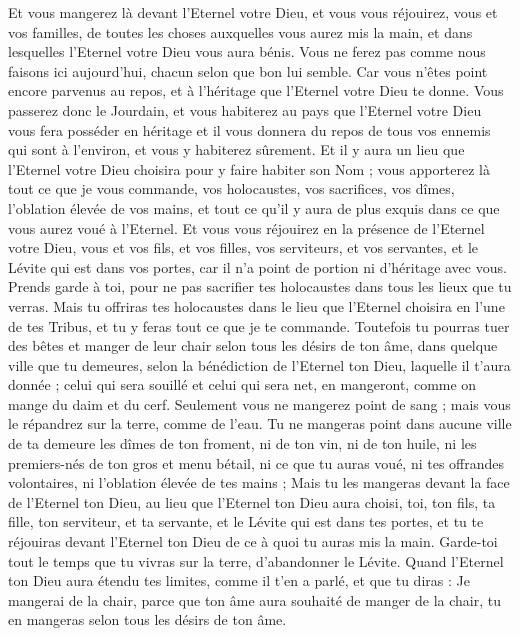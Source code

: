 \begin{multicols}{2}
Et vous mangerez là devant l'Eternel votre Dieu, et vous vous réjouirez, vous et vos familles, de toutes les choses auxquelles vous aurez mis la main, et dans lesquelles l'Eternel votre Dieu vous aura bénis.
Vous ne ferez pas comme nous faisons ici aujourd'hui, chacun selon que bon lui semble.
Car vous n'êtes point encore parvenus au repos, et à l'héritage que l'Eternel votre Dieu te donne.
Vous passerez donc le Jourdain, et vous habiterez au pays que l'Eternel votre Dieu vous fera posséder en héritage et il vous donnera du repos de tous vos ennemis qui sont à l'environ, et vous y habiterez sûrement.
Et il y aura un lieu que l'Eternel votre Dieu choisira pour y faire habiter son Nom ; vous apporterez là tout ce que je vous commande, vos holocaustes, vos sacrifices, vos dîmes, l'oblation élevée de vos mains, et tout ce qu'il y aura de plus exquis dans ce que vous aurez voué à l'Eternel.
Et vous vous réjouirez en la présence de l'Eternel votre Dieu, vous et vos fils, et vos filles, vos serviteurs, et vos servantes, et le Lévite qui est dans vos portes, car il n'a point de portion ni d'héritage avec vous.
Prends garde à toi, pour ne pas sacrifier tes holocaustes dans tous les lieux que tu verras.
Mais tu offriras tes holocaustes dans le lieu que l'Eternel choisira en l'une de tes Tribus, et tu y feras tout ce que je te commande.
Toutefois tu pourras tuer des bêtes et manger de leur chair selon tous les désirs de ton âme, dans quelque ville que tu demeures, selon la bénédiction de l'Eternel ton Dieu, laquelle il t'aura donnée ; celui qui sera souillé et celui qui sera net, en mangeront, comme on mange du daim et du cerf.
Seulement vous ne mangerez point de sang ; mais vous le répandrez sur la terre, comme de l'eau.
Tu ne mangeras point dans aucune ville de ta demeure les dîmes de ton froment, ni de ton vin, ni de ton huile, ni les premiers-nés de ton gros et menu bétail, ni ce que tu auras voué, ni tes offrandes volontaires, ni l'oblation élevée de tes mains ;
Mais tu les mangeras devant la face de l'Eternel ton Dieu, au lieu que l'Eternel ton Dieu aura choisi, toi, ton fils, ta fille, ton serviteur, et ta servante, et le Lévite qui est dans tes portes, et tu te réjouiras devant l'Eternel ton Dieu de ce à quoi tu auras mis la main.
Garde-toi tout le temps que tu vivras sur la terre, d'abandonner le Lévite.
Quand l'Eternel ton Dieu aura étendu tes limites, comme il t'en a parlé, et que tu diras : Je mangerai de la chair, parce que ton âme aura souhaité de manger de la chair, tu en mangeras selon tous les désirs de ton âme.

\end{multicols}
